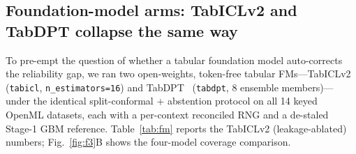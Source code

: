 \documentclass[11pt]{article}
\begin{document}
\subsection*{Foundation-model arms: TabICLv2 and TabDPT collapse the same way}
To pre-empt the question of whether a tabular foundation model auto-corrects the reliability gap, we ran two
open-weights, token-free tabular FMs---TabICLv2~\citep{qu2026tabicl} (\texttt{tabicl}, \texttt{n\_estimators=16})
and TabDPT~\citep{ma2024tabdpt} (\texttt{tabdpt}, $8$ ensemble members)---under the identical split-conformal +
abstention protocol on all 14 keyed OpenML datasets, each with a per-context reconciled RNG and a de-staled
Stage-1 GBM reference. Table~\ref{tab:fm} reports the TabICLv2 (leakage-ablated) numbers; Fig.~\ref{fig:f3}B
shows the four-model coverage comparison.
\end{document}

